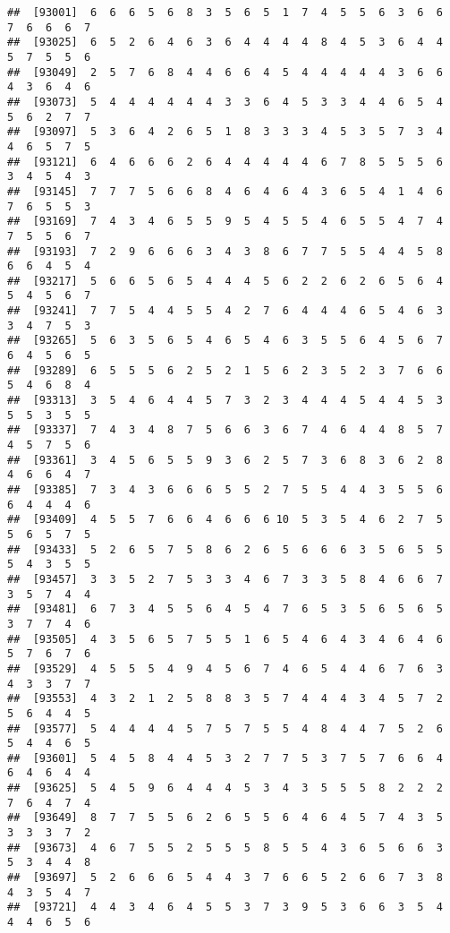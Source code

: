 \documentclass[
]{book}
\begin{document}
\begin{verbatim}
##  [93001]  6  6  6  5  6  8  3  5  6  5  1  7  4  5  5  6  3  6  6  7  6  6  6  7
##  [93025]  6  5  2  6  4  6  3  6  4  4  4  4  8  4  5  3  6  4  4  5  7  5  5  6
##  [93049]  2  5  7  6  8  4  4  6  6  4  5  4  4  4  4  4  3  6  6  4  3  6  4  6
##  [93073]  5  4  4  4  4  4  4  3  3  6  4  5  3  3  4  4  6  5  4  5  6  2  7  7
##  [93097]  5  3  6  4  2  6  5  1  8  3  3  3  4  5  3  5  7  3  4  4  6  5  7  5
##  [93121]  6  4  6  6  6  2  6  4  4  4  4  4  6  7  8  5  5  5  6  3  4  5  4  3
##  [93145]  7  7  7  5  6  6  8  4  6  4  6  4  3  6  5  4  1  4  6  7  6  5  5  3
##  [93169]  7  4  3  4  6  5  5  9  5  4  5  5  4  6  5  5  4  7  4  7  5  5  6  7
##  [93193]  7  2  9  6  6  6  3  4  3  8  6  7  7  5  5  4  4  5  8  6  6  4  5  4
##  [93217]  5  6  6  5  6  5  4  4  4  5  6  2  2  6  2  6  5  6  4  5  4  5  6  7
##  [93241]  7  7  5  4  4  5  5  4  2  7  6  4  4  4  6  5  4  6  3  3  4  7  5  3
##  [93265]  5  6  3  5  6  5  4  6  5  4  6  3  5  5  6  4  5  6  7  6  4  5  6  5
##  [93289]  6  5  5  5  6  2  5  2  1  5  6  2  3  5  2  3  7  6  6  5  4  6  8  4
##  [93313]  3  5  4  6  4  4  5  7  3  2  3  4  4  4  5  4  4  5  3  5  5  3  5  5
##  [93337]  7  4  3  4  8  7  5  6  6  3  6  7  4  6  4  4  8  5  7  4  5  7  5  6
##  [93361]  3  4  5  6  5  5  9  3  6  2  5  7  3  6  8  3  6  2  8  4  6  6  4  7
##  [93385]  7  3  4  3  6  6  6  5  5  2  7  5  5  4  4  3  5  5  6  6  4  4  4  6
##  [93409]  4  5  5  7  6  6  4  6  6  6 10  5  3  5  4  6  2  7  5  5  6  5  7  5
##  [93433]  5  2  6  5  7  5  8  6  2  6  5  6  6  6  3  5  6  5  5  5  4  3  5  5
##  [93457]  3  3  5  2  7  5  3  3  4  6  7  3  3  5  8  4  6  6  7  3  5  7  4  4
##  [93481]  6  7  3  4  5  5  6  4  5  4  7  6  5  3  5  6  5  6  5  3  7  7  4  6
##  [93505]  4  3  5  6  5  7  5  5  1  6  5  4  6  4  3  4  6  4  6  5  7  6  7  6
##  [93529]  4  5  5  5  4  9  4  5  6  7  4  6  5  4  4  6  7  6  3  4  3  3  7  7
##  [93553]  4  3  2  1  2  5  8  8  3  5  7  4  4  4  3  4  5  7  2  5  6  4  4  5
##  [93577]  5  4  4  4  4  5  7  5  7  5  5  4  8  4  4  7  5  2  6  5  4  4  6  5
##  [93601]  5  4  5  8  4  4  5  3  2  7  7  5  3  7  5  7  6  6  4  6  4  6  4  4
##  [93625]  5  4  5  9  6  4  4  4  5  3  4  3  5  5  5  8  2  2  2  7  6  4  7  4
##  [93649]  8  7  7  5  5  6  2  6  5  5  6  4  6  4  5  7  4  3  5  3  3  3  7  2
##  [93673]  4  6  7  5  5  2  5  5  5  8  5  5  4  3  6  5  6  6  3  5  3  4  4  8
##  [93697]  5  2  6  6  6  5  4  4  3  7  6  6  5  2  6  6  7  3  8  4  3  5  4  7
##  [93721]  4  4  3  4  6  4  5  5  3  7  3  9  5  3  6  6  3  5  4  4  4  6  5  6

\end{verbatim}
\end{document}
